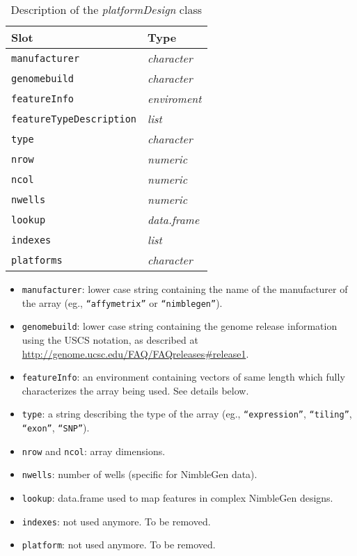 \documentclass{article}
\newcommand{\Rcode}[1]{{\texttt{#1}}}
\newcommand{\Robject}[1]{{\texttt{#1}}}
\newcommand{\Rclass}[1]{{\textit{#1}}}
\begin{document}
\begin{table}[h]
  \centering
  \begin{tabular}{|l|l|} \hline
    Slot                            &  Type \\ \hline
    \Robject{manufacturer}           & \Rclass{character} \\
    \Robject{genomebuild}            & \Rclass{character} \\
    \Robject{featureInfo}            & \Rclass{enviroment}\\
    \Robject{featureTypeDescription} & \Rclass{list}      \\
    \Robject{type}                   & \Rclass{character} \\
    \Robject{nrow}                   & \Rclass{numeric}   \\
    \Robject{ncol}                   & \Rclass{numeric}   \\
    \Robject{nwells}                 & \Rclass{numeric}   \\
    \Robject{lookup}                 & \Rclass{data.frame}\\
    \Robject{indexes}                & \Rclass{list}      \\
    \Robject{platforms}              & \Rclass{character} \\
    \hline
  \end{tabular}
  \caption{Description of the \Rclass{platformDesign} class}
  \label{tab:platformDesign}
\end{table}

\begin{itemize}
\item \Robject{manufacturer}: lower case string containing the name of
  the manufacturer of the array (eg., \Rcode{``affymetrix''} or
  \Rcode{``nimblegen''}).
\item \Robject{genomebuild}: lower case string containing the genome
  release information using the USCS notation, as described at
  \url{http://genome.ucsc.edu/FAQ/FAQreleases#release1}.
\item \Robject{featureInfo}: an environment containing vectors of same
  length which fully characterizes the array being used. See details
  below.
\item \Robject{type}: a string describing the type of the array (eg.,
  \Rcode{``expression''}, \Rcode{``tiling''}, \Rcode{``exon''},
  \Rcode{``SNP''}).
\item \Robject{nrow} and \Robject{ncol}: array dimensions.
\item \Robject{nwells}: number of wells (specific for NimbleGen data).
\item \Robject{lookup}: data.frame used to map features in complex
  NimbleGen designs.
\item \Robject{indexes}: not used anymore. To be removed.
\item \Robject{platform}: not used anymore. To be removed.
\end{itemize}
\end{document}
